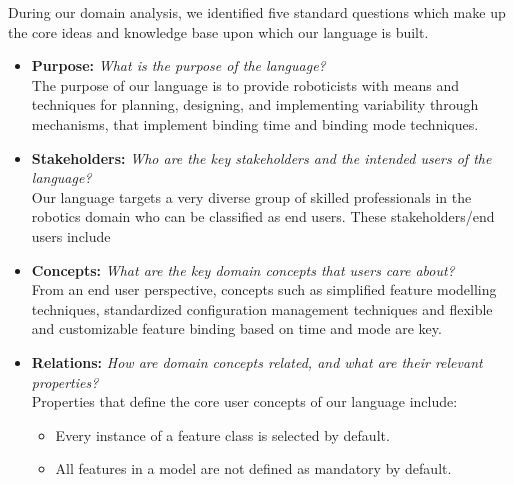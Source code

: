 \documentclass[conference]{IEEEtran}
\begin{document}
During our domain analysis, we identified five standard questions which make up the core ideas and knowledge base upon which our language is built. 
    \begin{itemize}
        \item \textbf{Purpose: } \textit{What is the purpose of the language?}\\
        The purpose of our language is to provide roboticists with means and techniques for planning, designing, and implementing variability through mechanisms, that implement binding time and binding mode techniques.
        \item \textbf{Stakeholders: } \textit{Who are the key stakeholders and the intended users of the language?}\\ Our language targets a very diverse group of skilled professionals in the robotics domain who can be classified as end users. These stakeholders/end users include 
        \item \textbf{Concepts: }\textit{What are the key domain concepts that users care about?}\\ From an end user perspective, concepts such as simplified feature modelling techniques, standardized configuration management techniques and flexible and customizable feature binding based on time and mode are key.
        \item \textbf{Relations: }\textit{How are domain concepts related, and what are their relevant properties?}\\
        Properties that define the core user concepts of our language include:
        \begin{itemize}
            \item Every instance of a feature class is selected by default.
            \item All features in a model are not defined as mandatory by default.

\end{itemize}
\end{itemize}
\end{document}
